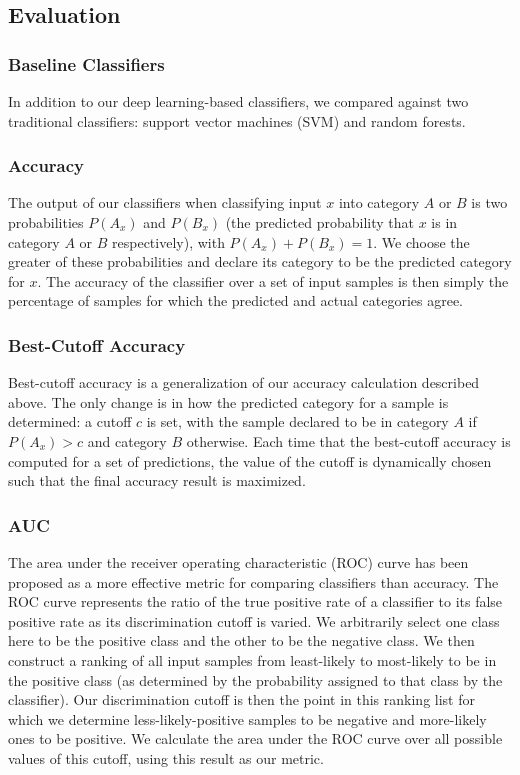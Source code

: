 \documentclass{article} %
\begin{document}
\subsection{Evaluation}
\subsubsection{Baseline Classifiers}
In addition to our deep learning-based classifiers, we compared against two traditional classifiers: support vector machines (SVM) and random forests.
\subsubsection{Accuracy}
The output of our classifiers when classifying input $x$ into category $A$ or $B$ is two probabilities $P(A_x)$ and $P(B_x)$ (the predicted probability that $x$ is in category $A$ or $B$ respectively), with $P(A_x)+P(B_x)=1$.  We choose the greater of these probabilities and declare its category to be the predicted category for $x$.  The accuracy of the classifier over a set of input samples is then simply the percentage of samples for which the predicted and actual categories agree.
\subsubsection{Best-Cutoff Accuracy}
Best-cutoff accuracy is a generalization of our accuracy calculation described above.  The only change is in how the predicted category for a sample is determined: a cutoff $c$ is set, with the sample declared to be in category $A$ if $P(A_x) > c$ and category $B$ otherwise.  Each time that the best-cutoff accuracy is computed for a set of predictions, the value of the cutoff is dynamically chosen such that the final accuracy result is maximized.
\subsubsection{AUC}
The area under the receiver operating characteristic (ROC) curve has been proposed \cite{DBLP:conf/ijcai/LingHZ03} as a more effective metric for comparing classifiers than accuracy.  The ROC curve represents the ratio of the true positive rate of a classifier to its false positive rate as its discrimination cutoff is varied.  We arbitrarily select one class here to be the positive class and the other to be the negative class.  We then construct a ranking of all input samples from least-likely to most-likely to be in the positive class (as determined by the probability assigned to that class by the classifier).  Our discrimination cutoff is then the point in this ranking list for which we determine less-likely-positive samples to be negative and more-likely ones to be positive.  We calculate the area under the ROC curve over all possible values of this cutoff, using this result as our metric.
\end{document}
